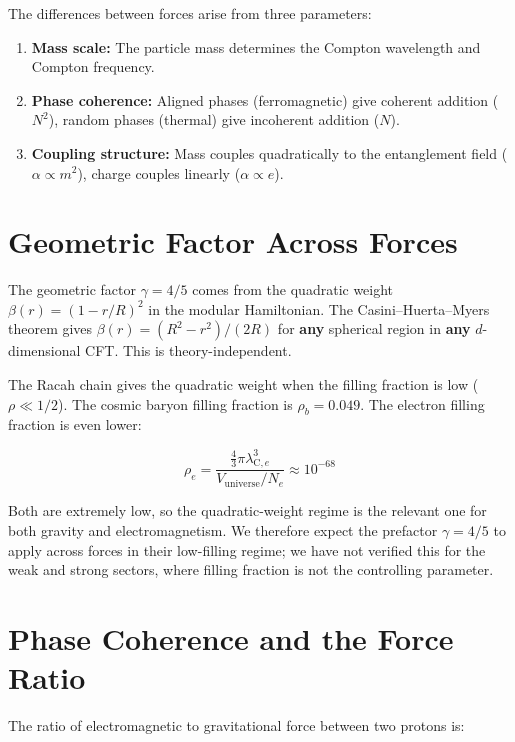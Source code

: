 \documentclass[11pt,letterpaper]{article}
\newcommand{\lambdace}{\lambda_{\mathrm{C},e}}
\begin{document}
The differences between forces arise from three parameters:

\begin{enumerate}
  \item \textbf{Mass scale:} The particle mass determines the Compton wavelength and Compton frequency.
  \item \textbf{Phase coherence:} Aligned phases (ferromagnetic) give coherent addition ($N^2$), random phases (thermal) give incoherent addition ($N$).
  \item \textbf{Coupling structure:} Mass couples quadratically to the entanglement field ($\alpha \propto m^2$), charge couples linearly ($\alpha \propto e$).
\end{enumerate}

\section{Geometric Factor Across Forces}

The geometric factor $\gamma = 4/5$ comes from the quadratic weight $\beta(r) = (1-r/R)^2$ in the modular Hamiltonian. The Casini--Huerta--Myers theorem gives $\beta(r) = (R^2-r^2)/(2R)$ for \textbf{any} spherical region in \textbf{any} $d$-dimensional CFT. This is theory-independent.

The Racah chain gives the quadratic weight when the filling fraction is low ($\rho \ll 1/2$). The cosmic baryon filling fraction is $\rho_b = 0.049$. The electron filling fraction is even lower:

\begin{equation}
  \rho_e = \frac{\frac{4}{3}\pi \lambdace^3}{V_{\mathrm{universe}}/N_e}
  \approx 10^{-68}
  \label{eq:electron_filling}
\end{equation}

Both are extremely low, so the quadratic-weight regime is the relevant
one for both gravity and electromagnetism. We therefore expect the
prefactor $\gamma = 4/5$ to apply across forces in their low-filling
regime; we have not verified this for the weak and strong sectors,
where filling fraction is not the controlling parameter.

\section{Phase Coherence and the Force Ratio}

The ratio of electromagnetic to gravitational force between two protons is:
\end{document}
